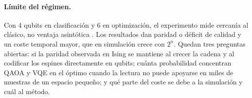 \paragraph{Límite del régimen.} Con 4 qubits en clasificación y 6 en optimización, el experimento mide cercanía al clásico, no ventaja asintótica \citep{preskill2018, thanasilp2022}. Los resultados dan paridad o déficit de calidad y un coste temporal mayor, que en simulación crece con $2^n$. Quedan tres preguntas abiertas: si la paridad observada en Ising se mantiene al crecer la cadena y al codificar los espines directamente en qubits; cuánta probabilidad concentran QAOA y VQE en el óptimo cuando la lectura no puede apoyarse en miles de muestras de un espacio pequeño; y qué parte del coste se debe a la simulación y cuál al método.
